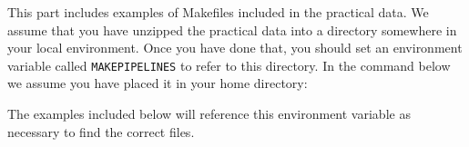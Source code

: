 \label{part:examples}

\begin{vplace}[0.7]
	
	\thispagestyle{empty}
	\large
	\noindent This part includes examples of Makefiles included in the practical	data. We assume that you have unzipped the practical data into a directory somewhere in your local environment. Once you have done that, you should set an environment variable called \texttt{MAKEPIPELINES} to refer to this directory. In the command below we assume you have placed it in your home directory:
	
	The examples included below will reference this environment variable as necessary to find the correct files.
	
\end{vplace}




 \clearpage  \setcounter{codehighlight}{0}
 \clearpage \setcounter{codehighlight}{0}

